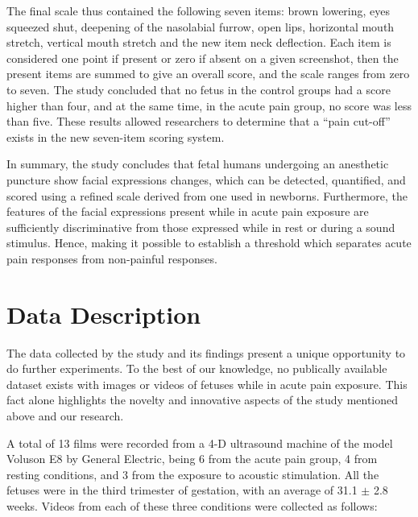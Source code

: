 The final scale thus contained the following seven items: brown lowering, eyes squeezed shut, deepening of the nasolabial furrow, open lips, horizontal mouth stretch, vertical mouth stretch and the new item neck deflection. Each item is considered one point if present or zero if absent on a given screenshot, then the present items are summed to give an overall score, and the scale ranges from zero to seven. The study concluded that no fetus in the control groups had a score higher than four, and at the same time, in the acute pain group, no score was less than five. These results allowed researchers to determine that a ``pain cut-off'' exists in the new seven-item scoring system.

In summary, the study concludes that fetal humans undergoing an anesthetic puncture show facial expressions changes, which can be detected, quantified, and scored using a refined scale derived from one used in newborns. Furthermore, the features of the facial expressions present while in acute pain exposure are sufficiently discriminative from those expressed while in rest or during a sound stimulus. Hence, making it possible to establish a threshold which separates acute pain responses from non-painful responses.

\section{Data Description}

The data collected by the study and its findings present a unique opportunity to do further experiments. To the best of our knowledge, no publically available dataset exists with images or videos of fetuses while in acute pain exposure. This fact alone highlights the novelty and innovative aspects of the study mentioned above and our research.

A total of 13 films were recorded from a 4-D ultrasound machine of the model Voluson E8 by General Electric, being 6 from the acute pain group, 4 from resting conditions, and 3 from the exposure to acoustic stimulation. All the fetuses were in the third trimester of gestation, with an average of 31.1 $\pm$ 2.8 weeks.  Videos from each of these three conditions were collected as follows:

